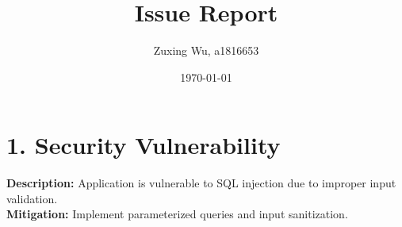 \documentclass{article}
\title{Issue Report}
\author{Zuxing Wu, a1816653}
\date{\today}
\begin{document}
\maketitle

\section*{1. Security Vulnerability}
\textbf{Description:} Application is vulnerable to SQL injection due to improper input validation.\\
\textbf{Mitigation:} Implement parameterized queries and input sanitization.
\end{document}
